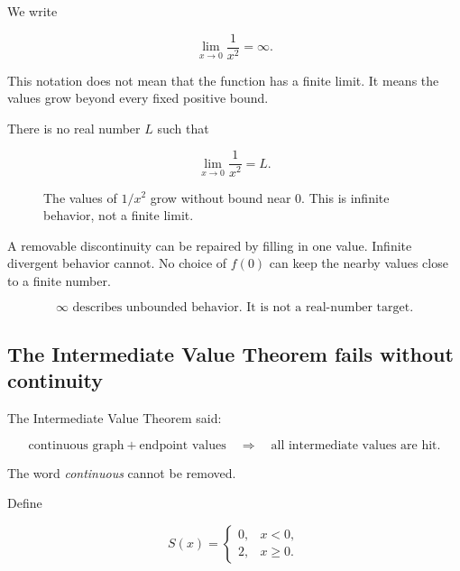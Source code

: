 We write

\[
\lim_{x\to0}\frac1{x^2}=\infty.
\]

This notation does not mean that the function has a finite limit.  It means the values grow beyond every fixed positive bound.

There is no real number \(L\) such that

\[
\lim_{x\to0}\frac1{x^2}=L.
\]

\begin{figure}[h]
\centering
{}
\caption{The values of \(1/x^2\) grow without bound near \(0\).  This is infinite behavior, not a finite limit.}
\label{fig:infinite-limit-warning}
\end{figure}

A removable discontinuity can be repaired by filling in one value.  Infinite divergent behavior cannot.  No choice of \(f(0)\) can keep the nearby values close to a finite number.

\[
\boxed{\infty\text{ describes unbounded behavior.  It is not a real-number target.}}
\]

\subsection{The Intermediate Value Theorem fails without continuity}
\label{subsec:ivt-fails-without-continuity-warning}

The Intermediate Value Theorem said:

\[
\text{continuous graph}+\text{endpoint values}
\quad\Longrightarrow\quad
\text{all intermediate values are hit.}
\]

The word \emph{continuous} cannot be removed.

Define

\[
S(x)=
\begin{cases}
0, & x<0,\\
2, & x\ge0.
\end{cases}
\]

